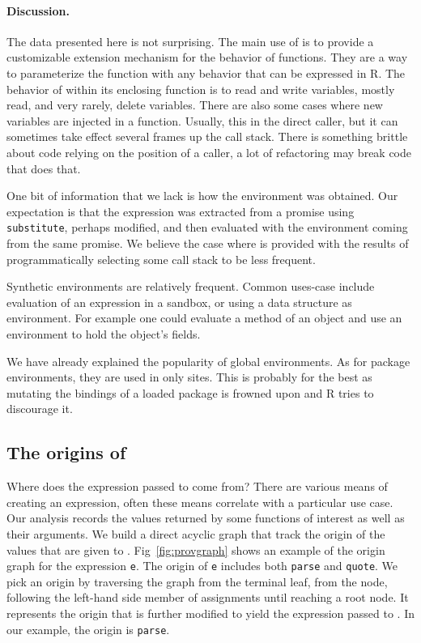 \documentclass[screen,acmsmall]{acmart}%
\renewcommand{\k}[1]{\lstinline |#1|\xspace}
\begin{document}
\paragraph{Discussion.}
The data presented here is not surprising. The main use of \eval is to provide a
customizable extension mechanism for the behavior of functions. They are a way
to parameterize the function with any behavior that can be expressed in R. The
behavior of \eval within its enclosing function is to read and write variables,
mostly read, and very rarely, delete variables. There are also some cases where
new variables are injected in a function. Usually, this in the direct caller,
but it can sometimes take effect several frames up the call stack. There is
something brittle about code relying on the position of a caller, a lot of
refactoring may break code that does that.

One bit of information that we lack is how the environment was obtained. Our
expectation is that the expression was extracted from a promise using
\k{substitute}, perhaps modified, and then evaluated with the environment coming
from the same promise. We believe the case where \eval is provided with the results
of programmatically selecting some call stack to be less frequent.

Synthetic environments are relatively frequent. Common uses-case include
evaluation of an expression in a sandbox, or using a data structure as
environment. For example one could evaluate a method of an object and use an
environment to hold the object's fields.

We have already explained the popularity of global environments. As for package
environments, they are used in only \packageNbPackageNamespaceEnvSites sites.
This is probably for the best as mutating the bindings of a loaded package is
frowned upon and R tries to discourage it.

\subsection{The origins of \eval}

Where does the expression passed to \eval come from? There are various means of
creating an expression, often these means correlate with a particular use case.
Our analysis records the values returned by some functions of interest as well
as their arguments. We build a direct acyclic graph that track the origin
of the values that are given to \eval. Fig~\ref{fig:provgraph} shows an example
of the origin graph for the expression \k{e}.
The origin of \k{e} includes both \k{parse} and \k{quote}. We pick an
origin by traversing the graph from the terminal leaf, \ie from the \eval node, following the left-hand side
member of assignments until reaching a root node. It represents the origin that is
further modified to yield the expression passed to \eval. In our example, the
origin is \k{parse}.
\end{document}
